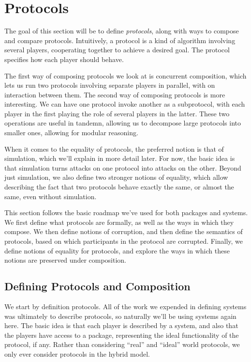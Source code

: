 \section{Protocols}

The goal of this section will be to define \emph{protocols},
along with ways to compose and compare protocols.
Intuitively, a protocol is a kind of algorithm involving several
players, cooperating together to achieve a desired goal.
The protocol specifies how each player should behave.

The first way of composing protocols we look at is concurrent composition,
which lets us run two protocols involving separate players in parallel,
with on interaction between them.
The second way of composing protocols is more interesting.
We can have one protocol invoke another as a subprotocol,
with each player in the first playing the role of several players
in the latter.
These two operations are useful in tandemn, allowing
us to decompose large protocols into smaller ones,
allowing for modular reasoning.

When it comes to the equality of protocols,
the preferred notion is that of simulation,
which we'll explain in more detail later.
For now, the basic idea is that simulation
turns attacks on one protocol into attacks on the other.
Beyond just simulation, we also define two stronger
notions of equality,
which allow describing the fact that two protocols behave exactly the same,
or almost the same, even without simulation.

This section follows the basic roadmap we've used for both packages
and systems.
We first define what protocols are formally, as well as the ways
in which they compose.
We then define notions of corruption, and then define the semantics
of protocols, based on which participants in the protocol
are corrupted.
Finally, we define notions of equality for protocols,
and explore the ways in which these notions are preserved under composition.

\subsection{Defining Protocols and Composition}

We start by definition protocols.
All of the work we expended in defining systems was ultimately
to describe protocols,
so naturally we'll be using systems again here.
The basic idea is that each player is described by a system,
and also that the players have access to a package,
representing the ideal functionality of the protocol,
if any.
Rather than considering ``real'' and ``ideal'' world protocols,
we only ever consider protocols in the hybrid model.

